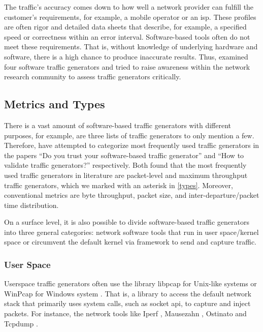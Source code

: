 \skippara The traffic's accuracy comes down to how well a network provider can fulfill the customer's requirements, for example, a mobile operator or an \gls{isp}.
These profiles are often rigor and detailed data sheets that describe, for example, a specified speed or correctness within an error interval.
Software-based tools often do not meet these requirements.
That is, without knowledge of underlying hardware and software, there is a high chance to produce inaccurate results.
Thus, \citet*{botta2010you} examined four software traffic generators and tried to raise awareness within the network research community to assess traffic generators critically.

\subsection{Metrics and Types}\label{metrictype}
There is a vast amount of software-based traffic generators with different purposes, for example, \cite{DITGDist48:online, Packetge32:online, ToolsThe22:online} are three lists of traffic generators to only mention a few.
Therefore, \citet{botta2010you, molnar2013validate} have attempted to categorize most frequently used traffic generators in the papers ``Do you trust your software-based traffic generator'' and ``How to validate traffic generators?'' respectively.
Both found that the most frequently used traffic generators in literature are packet-level and maximum throughput traffic generators, which we marked with an asterisk in \cref{types}.
Moreover, conventional metrics are byte throughput, packet size, and inter-departure/packet time distribution.



\skippara On a surface level, it is also possible to divide software-based traffic generators into three general categories:
network software tools that run in user space/kernel space or circumvent the default kernel via framework to send and capture traffic.

\clearpage
\subsubsection{User Space}
Userspace traffic generators often use the library libpcap for Unix-like systems or WinPcap for Windows system \cite{Programm92:online}.
That is, a library to access the default network stack that primarily uses system calls, such as socket \acrshort{api}, to capture and inject packets.
For instance, the network tools like Iperf \cite{iPerfThe63:online}, Mausezahn \cite{netsniff7:online}, Ostinato \cite{Ostinato63:online} and Tcpdump \cite{TCPDUMPL66:online}.

